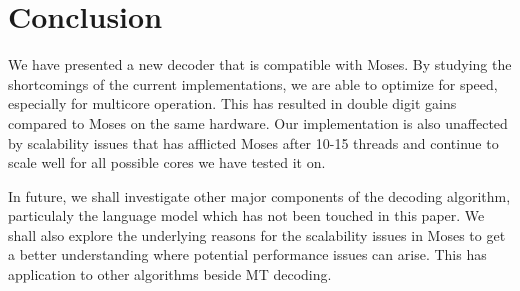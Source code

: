 \documentclass[11pt]{article}
\begin{document}
\section{Conclusion}

We have presented a new decoder that is compatible with Moses. By studying the shortcomings of the current implementations, we are able to optimize for speed, especially for multicore operation. This has resulted in double digit gains compared to Moses on the same hardware. Our implementation is also unaffected by scalability issues that has afflicted Moses after 10-15 threads and continue to scale well for all possible cores we have tested it on.

In future, we shall investigate other major components of the decoding algorithm, particulaly the language model which has not been touched in this paper. We shall also explore the underlying reasons for the scalability issues in Moses to get a better understanding where potential performance issues can arise. This has application to other algorithms beside MT decoding. 

% 



\end{document}

